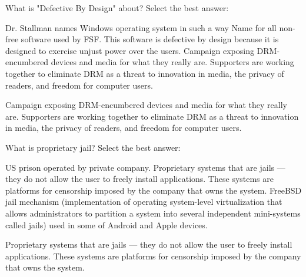 \begin{question}[type=exam]
What is "Defective By Design" about? Select the best answer:
\begin{itemize}
\chk Dr. Stallman names Windows operating system in such a way
\chk Name for all non-free software used by FSF. This software is defective by design because it is designed to exercise unjust power over the users.
\chk Campaign exposing DRM-encumbered devices and media for what they really are. Supporters are working together to eliminate DRM as a threat to innovation in media, the privacy of readers, and freedom for computer users.
\end{itemize}
\end{question}
\begin{solution}
Campaign exposing DRM-encumbered devices and media for what they really are. Supporters are working together to eliminate DRM as a threat to innovation in media, the privacy of readers, and freedom for computer users.
\end{solution}



\begin{question}[type=exam]
What is proprietary jail? Select the best answer:
\begin{itemize}
\chk US prison operated by private company. 
\chk Proprietary systems that are jails --- they do not allow the user to freely install applications. These systems are platforms for censorship imposed by the company that owns the system. 
\chk FreeBSD jail mechanism (implementation of operating system-level virtualization that allows administrators to partition a system into several independent mini-systems called jails) used in some of Android and Apple devices. 
\end{itemize}
\end{question}
\begin{solution}
Proprietary systems that are jails --- they do not allow the user to freely install applications. These systems are platforms for censorship imposed by the company that owns the system.
\end{solution}



